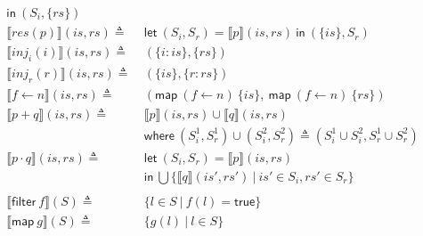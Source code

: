 \documentclass[12pt, letterpaper]{article}
\newcommand\interp[1]{\llbracket #1 \rrbracket}
\begin{document}
\begin{align*}
            \mathsf{in}\ (S_i, \{\mathit{rs}\})
            \\
        \interp { res(p) }(\mathit{is}, \mathit{rs})
            \triangleq\ &
            \mathsf{let}\ (S_i,S_r) = \interp {p}(\mathit{is}, \mathit{rs})\ 
            \mathsf{in}\ (\{\mathit{is}\}, S_r)
            \\
        \interp { inj_{i}(i) }(\mathit{is}, \mathit{rs})
            \triangleq\ &
            (\{\mathit{i : is}\}, \{\mathit{rs}\}) 
            \\
        \interp { inj_{r}(r) }(\mathit{is}, \mathit{rs})
            \triangleq\ &
            (\{\mathit{is}\},\{ \mathit{r : rs}\})
            \\
        \interp { f \leftarrow n }(is, rs)
            \triangleq\ &
            (\mathsf{map}\ (f\leftarrow n)\ \{is\},\
             \mathsf{map}\ (f\leftarrow n)\ \{rs\})
            \\ %
        \interp { p + q }(\mathit{is}, \mathit{rs})
            \triangleq\ &
            \interp { p }(\mathit{is}, \mathit{rs})\cup
            \interp { q }(\mathit{is}, \mathit{rs}) \\
            &\mathsf{where}\ (S_i^1, S_r^1)\cup (S_i^2, S_r^2)\triangleq
                (S_i^1\cup S_i^2, S_r^1\cup S_r^2)\\
        \interp { p \cdot q }(\mathit{is}, \mathit{rs})
            \triangleq\ &
            \mathsf{let}\ (S_i, S_r) = \interp{p}(is, rs)\\
            &\mathsf{in}\ \bigcup \{\interp{q}(\mathit{is}',\mathit{rs}')\ |\ \mathit{is}'\in S_i, \mathit{rs'}\in S_r\}
            \\
            \\
        \interp{\mathsf{filter}\ f}(S)
            \triangleq\ & \{l \in S\ |\ f(l) = \mathsf{true}\}\\
        \interp{\mathsf{map}\ g}(S)
            \triangleq\ &
            \{ g(l)\ |\ l\in S \} 
    \end{align*}
\end{document}
